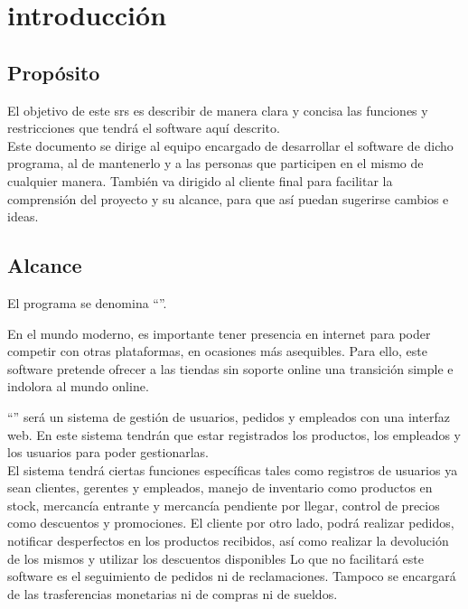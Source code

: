 \section{introducción}
\subsection{Propósito}
El objetivo de este \gls{srs} es describir de manera clara y concisa las funciones y restricciones que tendrá el software aquí descrito.\\
Este documento se dirige al equipo encargado de desarrollar el software de dicho programa, al de mantenerlo y a las personas que participen en el mismo de cualquier manera. También va dirigido al cliente final para facilitar la comprensión del proyecto y su alcance, para que así puedan sugerirse cambios e ideas.
\subsection{Alcance}
El programa se denomina ``\nombredelproyecto''.

En el mundo moderno, es importante tener presencia en internet para poder competir con otras plataformas, en ocasiones más asequibles. Para ello, este software pretende ofrecer a las tiendas sin soporte online una transición simple e indolora al mundo online.

``\nombredelproyecto'' será un sistema de gestión de usuarios, pedidos y empleados con una interfaz web. En este sistema tendrán que estar registrados los productos, los empleados y los usuarios para poder gestionarlas.\\
El sistema tendrá ciertas funciones específicas tales como registros de usuarios ya sean clientes, gerentes y empleados, manejo de inventario como productos en stock, mercancía entrante y mercancía pendiente por llegar, control de precios como descuentos y promociones. El cliente por otro lado, podrá realizar pedidos, notificar desperfectos en los productos recibidos, así como realizar la devolución de los mismos y utilizar los descuentos disponibles
Lo que no facilitará este software es el seguimiento de pedidos ni de reclamaciones. Tampoco se encargará de las trasferencias monetarias ni de compras ni de sueldos.

\glsaddall
\nocite{*}
{
    \printglossary[title=Definiciones\, acrónimos y abreviaturas, numberedsection]}





